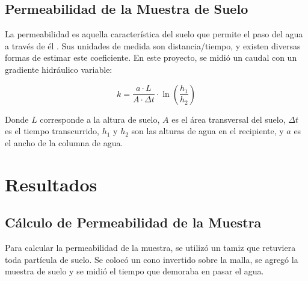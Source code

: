\subsection{Permeabilidad de la Muestra de Suelo}

La permeabilidad es aquella característica del suelo que permite el paso del agua a través de él \textbf{\cite{permeabilidad_suelos}}. Sus unidades de medida son distancia/tiempo, y existen diversas formas de estimar este coeficiente. En este proyecto, se midió un caudal con un gradiente hidráulico variable:

\begin{equation}
    k = \frac{a \cdot L}{A \cdot \Delta t} \cdot \ln\left(\frac{h_1}{h_2}\right)
\end{equation}

Donde \(L\) corresponde a la altura de suelo, \(A\) es el área transversal del suelo, \(\Delta t\) es el tiempo transcurrido, \(h_1\) y \(h_2\) son las alturas de agua en el recipiente, y \(a\) es el ancho de la columna de agua.

\newpage
\section{Resultados}

\subsection{Cálculo de Permeabilidad de la Muestra}

Para calcular la permeabilidad de la muestra, se utilizó un tamiz que retuviera toda partícula de suelo. Se colocó un cono invertido sobre la malla, se agregó la muestra de suelo y se midió el tiempo que demoraba en pasar el agua.

